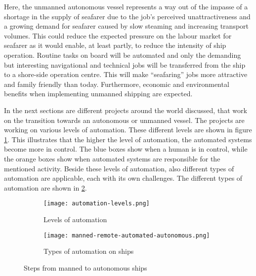 Here, the unmanned autonomous vessel represents a way out of the impasse of a shortage in the supply of seafarer due to the job’s perceived unattractiveness and a growing demand for seafarer caused by slow steaming and increasing transport volumes. This could reduce the expected pressure on the labour market for seafarer as it would enable, at least partly, to reduce the intensity of ship operation. Routine tasks on board will be automated and only the demanding but interesting navigational and technical jobs will be transferred from the ship to a shore-side operation centre. This will make “seafaring” jobs more attractive and family friendly than today. Furthermore, economic and environmental benefits when implementing unmanned shipping are expected. \cite{MUNIN2016}

In the next sections are different projects around the world discussed, that work on the transition towards an autonomous or unmanned vessel. The projects are working on various levels of automation. These different levels are shown in figure \ref{fig:automation-levels}. This illustrates that the higher the level of automation, the automated systems become more in control. The blue boxes show when a human is in control, while the orange boxes show when automated systems are responsible for the mentioned activity. 
Beside these levels of automation, also different types of automation are applicable, each with its own challenges. The different types of automation are shown in \ref{fig:manned-remote-autonomous}.

\begin{figure}[hb]
	\begin{subfigure}[b]{0.55\linewidth}
		\centering
		\texttt{[image: automation-levels.png]}
		\caption{Levels of automation}
		\label{fig:automation-levels}
	\end{subfigure} 
	\begin{subfigure}[b]{0.4\linewidth}
		\centering
		\texttt{[image: manned-remote-automated-autonomous.png]}
		\caption{Types of automation on ships}
		\label{fig:manned-remote-autonomous}
	\end{subfigure}
	\caption{Steps from manned to autonomous ships}
	\label{fig:automation} 
\end{figure}


